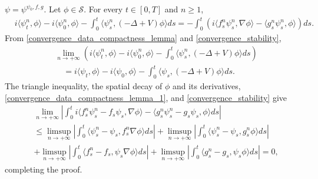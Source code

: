 \documentclass[a4paper,10pt]{amsart}
\theoremstyle{remark}
\numberwithin{equation}{section}
\begin{document}
    $\psi=\psi^{\psi_0,f,g}$. Let $\phi\in\mathscr{S}$. For every
    $t\in[0,T]$ and $n\geq1$,
	    \begin{align*}
	        &i\langle \psi^n_t,\phi\rangle-i\langle \psi^n_0,\phi\rangle
	        -\int_0^t\langle \psi^n_s,(-\Delta +V)\phi\rangle ds=-\int_0^t
	        \left(i\langle f^n_s\psi^n_s,\nabla \phi\rangle
	        -\langle g^n_s\psi^n_s,\phi\rangle\right)ds.
	    \end{align*}
    From \eqref{convergence_data_compactness_lemma} and
    \eqref{convergence_stability},
	    \begin{align*}
	     &\lim_{n\rightarrow +\infty}\left(
	     i\langle \psi^n_t,\phi\rangle-i\langle \psi^n_0,\phi\rangle
	     -\int_0^t\langle \psi^n_s,(-\Delta +V)\phi\rangle ds\right)\\
	     &\quad=i\langle \psi_t,\phi\rangle-i\langle \psi_0,\phi\rangle
	     -\int_0^t\langle \psi_s,(-\Delta +V)\phi\rangle ds.
	    \end{align*}
    The triangle inequality, the spatial decay of $\phi$ and its derivatives,
    \eqref{convergence_data_compactness_lemma_1}, and
    \eqref{convergence_stability} give
    \begin{align*}
      &\lim_{n\rightarrow+\infty}\left\lvert\int_0^t i\langle f^n_s\psi^n_s-f_s\psi_s,\nabla \phi\rangle-\langle g^n_s\psi^n_s-g_s\psi_s,\phi\rangle ds \right\rvert\\ & \leq \limsup_{n\rightarrow+\infty}\left\lvert\int_0^t \langle \psi^n_s-\psi_s,f^n_s\nabla \phi\rangle ds \right\rvert+\limsup_{n\rightarrow+\infty}\left\lvert\int_0^t \langle \psi^n_s-\psi_s,g^n_s  \phi\rangle ds \right\rvert\\ & +\limsup_{n\rightarrow+\infty}\left\lvert\int_0^t \langle f^n_s-f_s ,\psi_s\nabla \phi\rangle ds \right\rvert+\limsup_{n\rightarrow+\infty}\left\lvert\int_0^t \langle g^n_s-g_s, \psi_s  \phi\rangle ds \right\rvert =0,
    \end{align*}
completing the proof.
\end{document}
